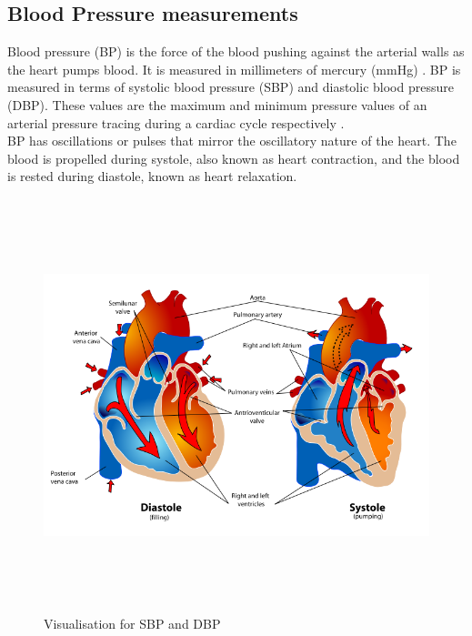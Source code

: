 \documentclass[11pt, a4paper]{article}
\begin{document}
\subsection{Blood Pressure measurements} 
Blood pressure (BP) is the force of the blood pushing against the arterial walls as the heart pumps blood. It is measured in millimeters of mercury (mmHg) \cite{Simjanoska20182}. BP  is  measured  in  terms  of  systolic  blood  pressure  (SBP)  and  diastolic  blood  pressure  (DBP). These values are the maximum and minimum pressure values of an arterial pressure tracing during a cardiac cycle respectively \cite{Simjanoska20181} \cite{Pradenas2020}.\\ \newline \noindent BP  has oscillations or pulses that mirror the oscillatory nature of the heart. The blood is propelled during systole, also known as heart contraction, and the blood is  rested during  diastole, known as heart  relaxation. \begin{figure}[H]
    \centering
    \includegraphics[width=12cm,height=12cm,keepaspectratio]{Figures/sbp_dbp.png}
    \caption{Visualisation for SBP and DBP \cite{SBP}}
    \label{hypertension}

\end{figure}
\end{document}
